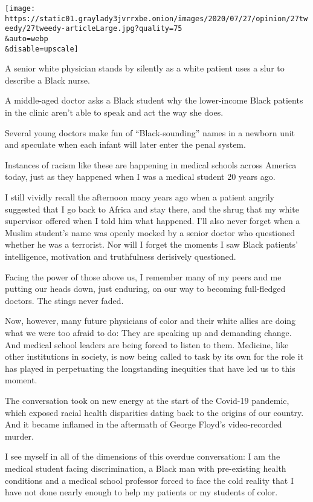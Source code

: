 \texttt{[image: https://static01.graylady3jvrrxbe.onion/images/2020/07/27/opinion/27tweedy/27tweedy-articleLarge.jpg?quality=75\\\&auto=webp\\\&disable=upscale]}

A senior white physician stands by silently as a white patient uses a
slur to describe a Black nurse.

A middle-aged doctor asks a Black student why the lower-income Black
patients in the clinic aren't able to speak and act the way she does.

Several young doctors make fun of ``Black-sounding'' names in a newborn
unit and speculate when each infant will later enter the penal system.

Instances of racism like these are happening in medical schools across
America today, just as they happened when I was a medical student 20
years ago.

I still vividly recall the afternoon many years ago when a patient
angrily suggested that I go back to Africa and stay there, and the shrug
that my white supervisor offered when I told him what happened. I'll
also never forget when a Muslim student's name was openly mocked by a
senior doctor who questioned whether he was a terrorist. Nor will I
forget the moments I saw Black patients' intelligence, motivation and
truthfulness derisively questioned.

Facing the power of those above us, I remember many of my peers and me
putting our heads down, just enduring, on our way to becoming
full-fledged doctors. The stings never faded.

Now, however, many future physicians of color and their white allies are
doing what we were too afraid to do: They are speaking up and demanding
change. And medical school leaders are being forced to listen to them.
Medicine, like other institutions in society, is now being called to
task by its own for the role it has played in perpetuating the
longstanding inequities that have led us to this moment.

The conversation took on new energy at the start of the Covid-19
pandemic, which exposed racial health disparities dating back to the
origins of our country. And it became inflamed in the aftermath of
George Floyd's video-recorded murder.

I see myself in all of the dimensions of this overdue conversation: I am
the medical student facing discrimination, a Black man with pre-existing
health conditions and a medical school professor forced to face the cold
reality that I have not done nearly enough to help my patients or my
students of color.

